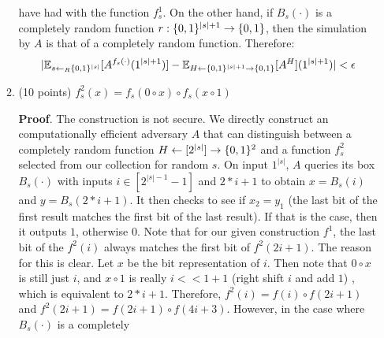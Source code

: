 \documentclass{article}
\begin{document}
\begin{enumerate}[,start=4]
\begin{enumerate}[noitemsep,topsep=\mdcompacttopsep,label=\alph*.]
have had with the function $f^1_s$. On the other hand, if $B_s(\cdot)$ is a completely random
function $r: \{0,1\}^{|s|+1} \to \{0,1\}$, then the simulation by $A$ is that of a completely random function.
Therefore:
\noindent\noindent\[%
|\E_{s \gets_R \zo^{|s|}} [A^{f_s(\cdot)}(1^{|s|+1})] - \E_{H \gets \zo^{|s|+1} \to \zo}[A^{H}](1^{|s|+1}) | < \epsilon
\]%
\mdfloatright{\ensuremath{\Box}}%

\item{}(10 points) $f^2_s(x)=f_s(0\circ x) \circ f_s(x\circ 1)$

\begin{mdbmarginx}{1ex}{0pt}{1ex}{0pt}%
\noindent{}\textbf{Proof}.  The construction is not secure. We directly construct an computationally efficient
adversary $A$ that can distinguish between
a completely random function $H \gets [2^{|s|}] \to \{0,1\}^2$ and a function $f^2_s$ selected 
from our collection for random $s$. On input $1^{|s|}$, $A$ queries its box $B_s(\cdot)$ with inputs
$i \in [2^{|s|-1} - 1]$ and $2*i + 1$ to obtain $x = B_s(i)$ and $y = B_s(2*i+1)$. It then
checks to see if $x_2 = y_1$ (the last bit of the first result matches the first bit of the 
last result). If that is the case, then it outputs $1$, otherwise $0$. Note that for our given
construction $f^1$, the last bit of the $f^2(i)$ always matches the first bit of $f^2(2i+1)$. 
The reason for this is clear. Let $x$ be the bit representation of $i$. Then note that 
$0 \circ x$ is still just $i$, and $x \circ 1$ is really $i << 1 + 1$ (right shift $i$ and add $1$)
, which is equivalent to $2*i + 1$. Therefore, $f^2(i) = f(i) \circ f(2i + 1)$ and 
$f^2(2i + 1) = f(2i + 1) \circ f(4i + 3)$. However, in the case where $B_s(\cdot)$ is a completely 

\end{mdbmarginx}
\end{enumerate}
\end{enumerate}
\end{document}
